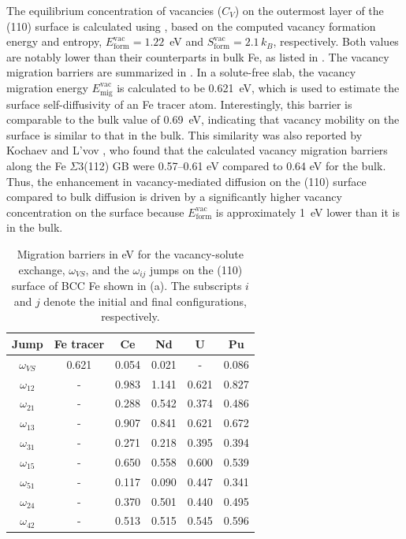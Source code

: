 \documentclass[preprint,12pt]{elsarticle}
\begin{document}
The equilibrium concentration of vacancies (\( C_V \)) on the outermost layer of the (110) surface is calculated using , based on the computed vacancy formation energy and entropy, \( E_{\text{form}}^{\text{vac}} = 1.22 \)~eV and \( S_{\text{form}}^{\text{vac}} = 2.1\,k_B \), respectively. Both values are notably lower than their counterparts in bulk Fe, as listed in . The vacancy migration barriers are summarized in . In a solute-free slab, the vacancy migration energy \( E_{\text{mig}}^{\text{vac}} \) is calculated to be 0.621~eV, which is used to estimate the surface self-diffusivity of an Fe tracer atom. Interestingly, this barrier is comparable to the bulk value of 0.69~eV, indicating that vacancy mobility on the surface is similar to that in the bulk. This similarity was also reported by Kochaev and L'vov \cite{kochaev2024atomistic}, who found that the calculated vacancy migration barriers along the Fe $\Sigma3$(112) GB were 0.57–0.61 eV compared to 0.64 eV for the bulk. Thus, the enhancement in vacancy-mediated diffusion on the (110) surface compared to bulk diffusion is driven by a significantly higher vacancy concentration on the surface because \( E_{\text{form}}^{\text{vac}} \) is approximately 1~eV lower than it is in the bulk.


\begin{table}[!ht]
    \centering
    \caption{Migration barriers in eV for the vacancy-solute exchange, $\omega_{VS}$, and the $\omega_{ij}$ jumps on the (110) surface of BCC Fe shown in (a). The subscripts $i$ and $j$ denote the initial and final configurations, respectively. }
    \begin{tabular}{|c|c|c|c|c|c|}
      \hline
      Jump &Fe tracer& Ce & Nd & U & Pu \\
      \hline
      $\omega_{VS}$&0.621&0.054 &0.021 &- &0.086  \\
      \hline
      $\omega_{12}$&-&0.983 &1.141 &0.621 &0.827 \\
      $\omega_{21}$&-&0.288 &0.542 &0.374 &0.486 \\
      \hline
      $\omega_{13}$&-&0.907 &0.841 &0.621 &0.672 \\
      $\omega_{31}$&-&0.271 &0.218 &0.395 &0.394 \\
      \hline
      $\omega_{15}$&-&0.650 &0.558 &0.600 &0.539 \\
      $\omega_{51}$&-&0.117 &0.090 &0.447 &0.341 \\ 
      \hline
      $\omega_{24}$&-&0.370 &0.501 &0.440 &0.495 \\
      $\omega_{42}$&-&0.513 &0.515 &0.545 &0.596 \\
      \hline
    \end{tabular}
    \label{tab:mig_barriers_surface}
\end{table}
\end{document}
